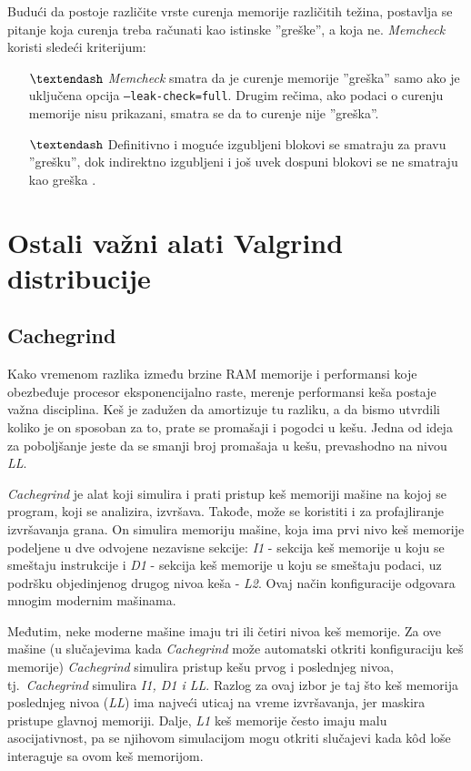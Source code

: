 \documentclass[12pt,oneside]{memoir}
\theoremstyle{plain}
\theoremstyle{definition}
\begin{document}
Budući da postoje različite vrste curenja memorije različitih težina, postavlja se pitanje koja curenja treba računati kao istinske ''greške'', a koja ne. \textit{Memcheck} koristi sledeći kriterijum:
\begin{itemize}
\item[$\textendash$] \textit{Memcheck} smatra da je curenje memorije ''greška'' samo ako je uključena opcija \texttt{--leak-check=full}. Drugim rečima, ako podaci o curenju memorije nisu prikazani, smatra se da to curenje nije ''greška''.
\item[$\textendash$] Definitivno i moguće izgubljeni blokovi se smatraju za pravu ''grešku'', dok indirektno izgubljeni i još uvek dospuni blokovi se ne smatraju kao greška \cite{Memcheck}. 
\end{itemize}

\section{Ostali važni alati Valgrind distribucije}
\subsection{Cachegrind}
Kako vremenom razlika između brzine RAM memorije i performansi koje obezbeđuje procesor eksponencijalno raste, merenje performansi keša postaje važna disciplina. Keš je zadužen da amortizuje tu razliku, a da bismo utvrdili koliko je on sposoban za to, prate se promašaji i pogodci u kešu. Jedna od  ideja za poboljšanje jeste da se smanji broj promašaja u kešu, prevashodno na nivou \textit{LL}.

\textit{Cachegrind} je alat koji simulira i prati pristup keš memoriji mašine na kojoj se program, koji se analizira, izvršava. Takođe, može se koristiti i za profajliranje izvršavanja grana. On simulira memoriju mašine, koja ima prvi nivo keš memorije podeljene u dve odvojene nezavisne sekcije: \textit{I1} - sekcija keš memorije u koju se smeštaju instrukcije i \textit{D1} - sekcija keš memorije u koju se smeštaju podaci, uz podršku objedinjenog drugog nivoa keša - \textit{L2}. Ovaj način konfiguracije odgovara mnogim modernim mašinama.


Međutim, neke moderne mašine imaju tri ili četiri nivoa keš memorije. Za ove mašine (u slučajevima kada \textit{Cachegrind} može automatski otkriti konfiguraciju keš memorije) \textit{Cachegrind} simulira pristup kešu prvog i poslednjeg nivoa, tj.~\textit{Cachegrind} simulira \textit{I1, D1 i LL}. Razlog za ovaj izbor je taj što keš memorija poslednjeg nivoa (\textit{LL}) ima najveći uticaj na vreme izvršavanja, jer maskira pristupe glavnoj memoriji. Dalje, \textit{L1} keš memorije često imaju malu asocijativnost, pa se njihovom simulacijom mogu otkriti slučajevi kada k\^od loše interaguje sa ovom keš memorijom.
\end{document}
